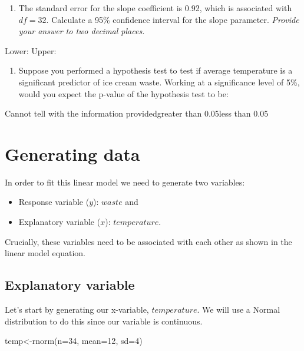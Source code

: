 \documentclass[
]{book}
\newenvironment{Shaded}{\begin{snugshade}}{\end{snugshade}}
\newcommand{\AttributeTok}[1]{\textcolor[rgb]{0.77,0.63,0.00}{#1}}
\newcommand{\DecValTok}[1]{\textcolor[rgb]{0.00,0.00,0.81}{#1}}
\newcommand{\FunctionTok}[1]{\textcolor[rgb]{0.00,0.00,0.00}{#1}}
\newcommand{\NormalTok}[1]{#1}
\newcommand{\OtherTok}[1]{\textcolor[rgb]{0.56,0.35,0.01}{#1}}
\providecommand{\tightlist}{%
  \setlength{\itemsep}{0pt}\setlength{\parskip}{0pt}}
\begin{document}
\begin{enumerate}
\def\labelenumi{\arabic{enumi}.}
\setcounter{enumi}{1}
\tightlist
\item
  The standard error for the slope coefficient is 0.92, which is associated with \(df=32\). Calculate a 95\% confidence interval for the slope parameter. \emph{Provide your answer to two decimal places.}
\end{enumerate}

Lower:
Upper:

\begin{enumerate}
\def\labelenumi{\arabic{enumi}.}
\setcounter{enumi}{2}
\tightlist
\item
  Suppose you performed a hypothesis test to test if average temperature is a significant predictor of ice cream waste. Working at a significance level of 5\%, would you expect the p-value of the hypothesis test to be:
\end{enumerate}

Cannot tell with the information providedgreater than 0.05less than 0.05

\hypertarget{generating-data}{%
\section{Generating data}\label{generating-data}}

In order to fit this linear model we need to generate two variables:

\begin{itemize}
\tightlist
\item
  Response variable (\(y\)): \(waste\) and
\item
  Explanatory variable (\(x\)): \(temperature\).
\end{itemize}

Crucially, these variables need to be associated with each other as shown in the linear model equation.

\hypertarget{explanatory-variable}{%
\subsection{Explanatory variable}\label{explanatory-variable}}

Let's start by generating our x-variable, \(temperature\). We will use a Normal distribution to do this since our variable is continuous.

\begin{Shaded}
\begin{Highlighting}[]
\NormalTok{temp}\OtherTok{\textless{}{-}}\FunctionTok{rnorm}\NormalTok{(}\AttributeTok{n=}\DecValTok{34}\NormalTok{, }\AttributeTok{mean=}\DecValTok{12}\NormalTok{, }\AttributeTok{sd=}\DecValTok{4}\NormalTok{)}
\end{Highlighting}
\end{Shaded}
\end{document}
